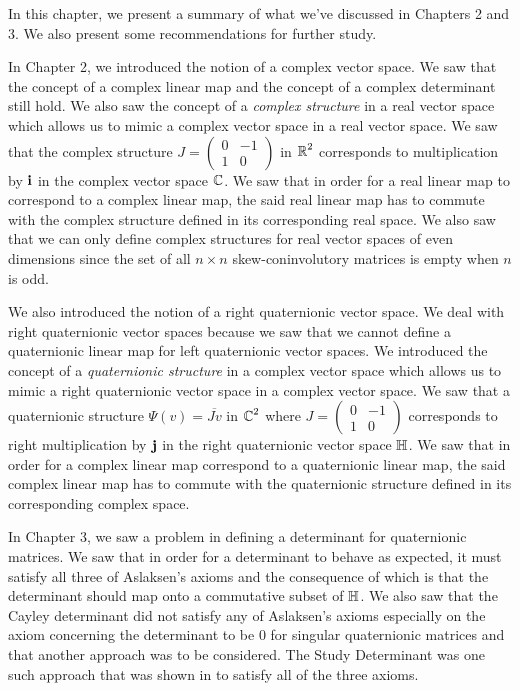 In this chapter, we present a summary of what we've discussed in Chapters 2 and 3. We also present some recommendations for further study.

In Chapter 2, we introduced the notion of a complex vector space. We saw that the concept of a complex linear map and the concept of a complex determinant still hold. We also saw the concept of a \emph{complex structure} in a real vector space which allows us to mimic a complex vector space in a real vector space. We saw that the complex structure $J =
\begin{pmatrix}
 		0 & -1 \\
 		1 & 0
 \end{pmatrix}$ in $\operatorname{\mathbb{R}}^2$
 corresponds to multiplication by $\textbf{i}$ in the complex vector space $\operatorname{\mathbb{C}}$.
 We saw that in order for a real linear map to correspond to a complex linear map, the said  real linear map has to commute with the complex structure defined in its corresponding real space. We also saw that we can only define complex structures for real vector spaces of even dimensions since the set of all $n \times n$ skew-coninvolutory matrices is empty when $n$ is odd.

 We also introduced the notion of a right quaternionic vector space. We deal with right quaternionic vector spaces because we saw that we cannot define a quaternionic linear map for left quaternionic vector spaces. We introduced the concept of a \emph{quaternionic structure} in a complex vector space which allows us to mimic a right quaternionic vector space in a complex vector space. We saw that a quaternionic structure $\Psi(v) = \overline{Jv}$ in $\operatorname{\mathbb{C}}^2$ where $J = 
\begin{pmatrix}
 		0 & -1 \\
 		1 & 0
 \end{pmatrix}$
 corresponds to right multiplication by $\textbf{j}$ in the right quaternionic vector space $\operatorname{\mathbb{H}}$. We saw that in order for a complex linear map correspond to a quaternionic linear map, the said complex linear map has to commute with the quaternionic structure defined in its corresponding complex space. 

In Chapter 3, we saw a problem in defining a determinant for quaternionic matrices. We saw that in order for a determinant to behave as expected, it must satisfy all three of Aslaksen's axioms and the consequence of which is that the determinant should map onto a commutative subset of $\operatorname{\mathbb{H}}$. We also saw that the Cayley determinant did not satisfy any of Aslaksen's axioms especially on the axiom concerning the determinant to be 0 for singular quaternionic matrices and that another approach was to be considered. The Study Determinant was one such approach that was shown in \cite{aslaksen} to satisfy all of the three axioms. 

